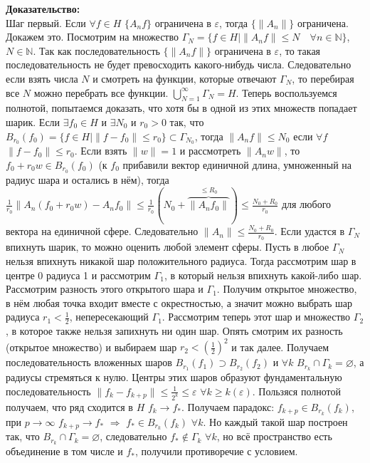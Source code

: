 \documentclass[12pt]{article}
\begin{document}
\textbf{Доказательство:}\\
Шаг первый. Если $\forall f \in H$ $\{A_nf\}$ ограничена в $\varepsilon$, тогда $\{\|A_n\|\}$ ограничена.
Докажем это.
Посмотрим на множество $\Gamma_N = \{f \in H \mid \|A_n f\| \le N \quad \forall n \in \mathbb N\}$, $N \in \mathbb N$.
Так как последовательность $\{\|A_nf\|\}$ ограничена в $\varepsilon$, то такая последовательность не будет превосходить какого-нибудь числа.
Следовательно если взять числа $N$ и смотреть на функции, которые отвечают $\Gamma_N$, то перебирая все $N$ можно перебрать все функции.
$\bigcup\limits_{N = 1}^\infty \Gamma_N = H$.
Теперь воспользуемся полнотой, попытаемся доказать, что хотя бы в одной из этих множеств попадает шарик.
Если $\exists f_0 \in H$ и $\exists N_0$ и $r_0 > 0$ так, что $B_{r_0}(f_0)=\{f \in H \mid \|f - f_0\| \le r_0\} \subset \Gamma_{N_0}$, тогда $\|A_n f\| \le N_0$
если $\forall f$ $\|f - f_0\| \le r_0$.
Если взять $\|w\| = 1$ и рассмотреть $\|A_n w\|$, то $f_0 + r_0 w \in B_{r_0}(f_0)$ (к $f_0$ прибавили вектор единичной длина, умноженный на радиус шара
и остались в нём), тогда $\frac{1}{r_0}\|A_n(f_0 + r_0 w) - A_n f_0\| \le \frac{1}{r_0}(N_0 + \overbrace{\|A_n f_0\|}^{\le R_0})\le \frac{N_0 + R_0}{r_0}$
для любого вектора на единичной сфере.
Следовательно $\|A_n\| \le \frac{N_0 + R_0}{r_0}$.
Если удастся в $\Gamma_N$ впихнуть шарик, то можно оценить любой элемент сферы.
Пусть в любое $\Gamma_N$ нельзя впихнуть никакой шар положительного радиуса.
Тогда рассмотрим шар в центре 0 радиуса 1 и рассмотрим $\Gamma_1$, в который нельзя впихнуть какой-либо шар.
Рассмотрим разность этого открытого шара и $\Gamma_1$.
Получим открытое множество, в нём любая точка входит вместе с окрестностью, а значит можно выбрать шар радиуса $r_1 < \frac12$, непересекающий $\Gamma_1$.
Рассмотрим теперь этот шар и множество $\Gamma_2$, в которое также нельзя запихнуть ни один шар.
Опять смотрим их разность (открытое множество) и выбираем шар $r_2 < \left(\frac12\right)^2$ и так далее.
Получаем последовательность вложенных шаров $B_{r_1}(f_1) \supset B_{r_2}(f_2)$ и $\forall k$ $B_{r_k} \cap \Gamma_k = \varnothing$, а радиусы стремяться к нулю.
Центры этих шаров образуют фундаментальную последовательность $\|f_k - f_{k + p}\| \le \frac{1}{2^k} \le \varepsilon$ $\forall k \ge k(\varepsilon)$.
Пользяся полнотой получаем, что ряд сходится в $H$ $f_k \to f_*$.
Получаем парадокс: $f_{k+p} \in B_{r_k}(f_k)$, при $p \to \infty$ $f_{k+p} \to f_*$ $\Rightarrow$ $f_* \in B_{r_k}(f_k)$ $\forall k$.
Но каждый такой шар построен так, что $B_{r_k} \cap \Gamma_k = \varnothing$, следовательно $f_* \notin \Gamma_k$ $\forall k$, но всё пространство есть объединение
в том числе и $f_*$, получили противоречие с условием.
\end{document}
